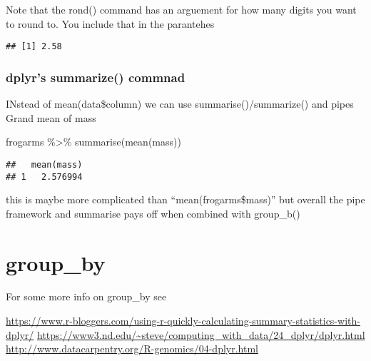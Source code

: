 \documentclass[
]{book}
\newenvironment{Shaded}{\begin{snugshade}}{\end{snugshade}}
\newcommand{\AttributeTok}[1]{\textcolor[rgb]{0.77,0.63,0.00}{#1}}
\newcommand{\DecValTok}[1]{\textcolor[rgb]{0.00,0.00,0.81}{#1}}
\newcommand{\FunctionTok}[1]{\textcolor[rgb]{0.00,0.00,0.00}{#1}}
\newcommand{\NormalTok}[1]{#1}
\newcommand{\SpecialCharTok}[1]{\textcolor[rgb]{0.00,0.00,0.00}{#1}}
\begin{document}
Note that the rond() command has an arguement for how many digits you want to round to. You include that in the parantehes

\begin{Shaded}
\end{Shaded}

\begin{verbatim}
## [1] 2.58
\end{verbatim}

\hypertarget{dplyrs-summarize-commnad}{%
\subsubsection{dplyr's summarize() commnad}\label{dplyrs-summarize-commnad}}

INstead of mean(data\$column) we can use summarise()/summarize() and pipes
Grand mean of mass

\begin{Shaded}
\begin{Highlighting}[]
\NormalTok{frogarms }\SpecialCharTok{\%\textgreater{}\%} \FunctionTok{summarise}\NormalTok{(}\FunctionTok{mean}\NormalTok{(mass))}
\end{Highlighting}
\end{Shaded}

\begin{verbatim}
##   mean(mass)
## 1   2.576994
\end{verbatim}

this is maybe more complicated than ``mean(frogarms\$mass)'' but overall the pipe framework and summarise pays off when combined with group\_b()

\hypertarget{group_by}{%
\section{group\_by}\label{group_by}}

For some more info on group\_by see

\url{https://www.r-bloggers.com/using-r-quickly-calculating-summary-statistics-with-dplyr/}
\url{https://www3.nd.edu/~steve/computing_with_data/24_dplyr/dplyr.html}
\url{http://www.datacarpentry.org/R-genomics/04-dplyr.html}
\end{document}
